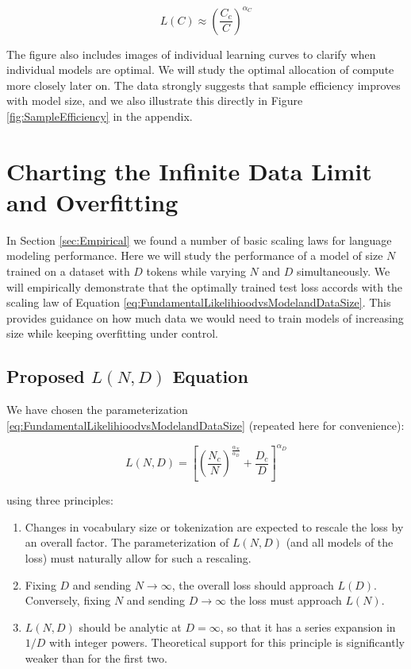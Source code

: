 \begin{equation}
L(C) \approx \left( \frac{C_c}{C} \right)^{\alpha_C}
\end{equation}

The figure also includes images of individual learning curves to clarify when individual models are optimal.  We will study the optimal allocation of compute more closely later on. The data strongly suggests that sample efficiency improves with model size, and we also illustrate this directly in Figure \ref{fig:SampleEfficiency} in the appendix.  

\section{Charting the Infinite Data Limit and Overfitting}
\label{sec:ChartingOverfitting}

In Section \ref{sec:Empirical} we found a number of basic  scaling laws for language modeling performance.  Here we will study the performance of a model of size $N$ trained on a dataset with $D$ tokens while varying $N$ and $D$ simultaneously.  We will empirically demonstrate that the optimally trained test loss accords with the scaling law of Equation \eqref{eq:FundamentalLikelihioodvsModelandDataSize}.  This  provides guidance on how much data we would need to train models of increasing size while keeping overfitting under control.

\subsection{Proposed $L(N,D)$ Equation}

We have chosen the parameterization \eqref{eq:FundamentalLikelihioodvsModelandDataSize} (repeated here for convenience):

\begin{equation}
L(N, D) 
= \left[ \left( \frac{N_c}{N} \right)^{\frac{\alpha_N}{\alpha_D}} + \frac{D_c}{D}  \right]^{\alpha_D}
\end{equation}

using three principles:

\begin{enumerate}
\item Changes in vocabulary size or tokenization are expected to rescale the loss by an overall factor.  The parameterization of $L(N,D)$ (and all models of the loss) must naturally allow for such a rescaling.
\item Fixing $D$ and sending $N \to \infty$,  the overall loss should approach $L(D)$.  Conversely, fixing $N$ and sending $D \to \infty$ the loss must approach $L(N)$.
\item $L(N,D)$ should be analytic at $D=\infty$, so that it has a series expansion in $1/D$ with integer powers.  Theoretical support for this principle is significantly weaker than for the first two.
\end{enumerate}


